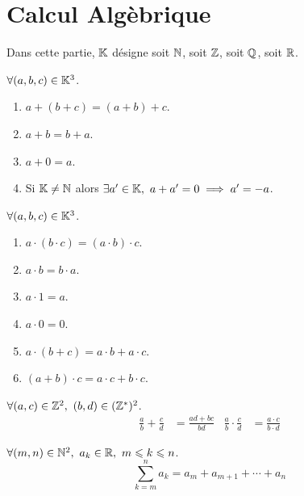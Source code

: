 \chapter{Calcul Algèbrique}
\par \noindent Dans cette partie, $\mathbb{K}$ désigne soit $\mathbb{N}$, soit $\mathbb{Z}$, soit $\mathbb{Q}$, soit $\mathbb{R}$.

\begin{axiom}
    $\forall (a, b, c) \in \mathbb{K}^3$.
    \begin{enumerate}
    	\item $a + (b + c) = (a + b) + c$.
    	\item $a + b = b + a$.
    	\item $a + 0 = a$.
    	\item Si $\mathbb{K} \neq \mathbb{N}$ alors $\exists a' \in \mathbb{K},\ a + a' = 0 \implies a' = -a$.
    \end{enumerate}
\end{axiom}

\begin{axiom}
    $\forall (a, b, c) \in \mathbb{K}^3$. 
    \begin{enumerate}
    	\item $a \cdot (b \cdot c) = (a \cdot b) \cdot c$.
    	\item $a \cdot b = b \cdot a$.
    	\item $a \cdot 1 = a$.
    	\item $a \cdot 0 = 0$.
    	\item $a \cdot (b + c) = a \cdot b + a \cdot c$.
    	\item $(a + b) \cdot c = a \cdot c + b \cdot c$.
    \end{enumerate}
\end{axiom}

\begin{proposition}
    $\forall (a, c) \in \mathbb{Z}^2,\ (b, d) \in (\mathbb{Z}^*)^2$.
    \begin{align*}
        \frac{a}{b} + \frac{c}{d} &= \frac{ad + bc}{bd} & \frac{a}{b} \cdot \frac{c}{d} &= \frac{a \cdot c}{b \cdot d}
    \end{align*}
\end{proposition}

\begin{definition}[Somme]
    $\forall (m, n) \in \mathbb{N}^2,\ a_k \in \mathbb{R},\ m \leqslant k \leqslant n$.
    \[ \sum_{k = m}^n a_k = a_m + a_{m + 1} + \cdots + a_n \]
\end{definition}

